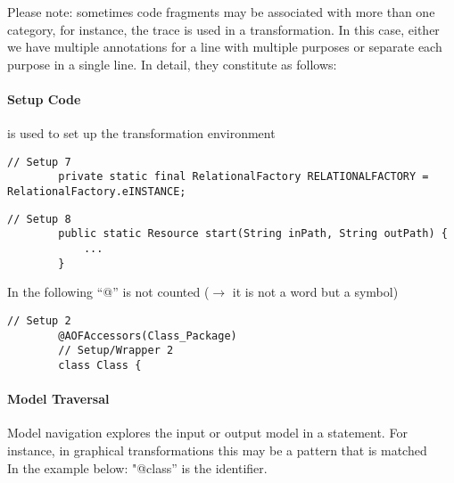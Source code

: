 \documentclass{article}
\begin{document}
    \noindent
    Please note: sometimes code fragments may be associated with more than one category, for instance, the trace is used in a transformation. 
    In this case, either we have multiple annotations for a line with multiple purposes or separate each purpose in a single line. %
    In detail, they constitute as follows:
         \paragraph{Setup Code} is used to set up the transformation environment\\ 
         
        \begin{lstlisting}[style=modernJava]
        // Setup 7
        private static final RelationalFactory RELATIONALFACTORY = RelationalFactory.eINSTANCE; 
        \end{lstlisting}

        \begin{lstlisting}[style=modernJava]
         // Setup 8
        public static Resource start(String inPath, String outPath) {
            ...
        }
        \end{lstlisting}
        
        In the following ``@'' is not counted ($\rightarrow$ it is not a word but a symbol)
      \begin{lstlisting}[language=myJava]
        // Setup 2 
        @AOFAccessors(Class_Package)
        // Setup/Wrapper 2
        class Class {
       \end{lstlisting}


        \paragraph{Model Traversal} %
        Model navigation explores the input or output model in a statement. For instance, in graphical transformations this may be a pattern that is matched \\ In the example below: "@class'' is the identifier. 
\end{document}
